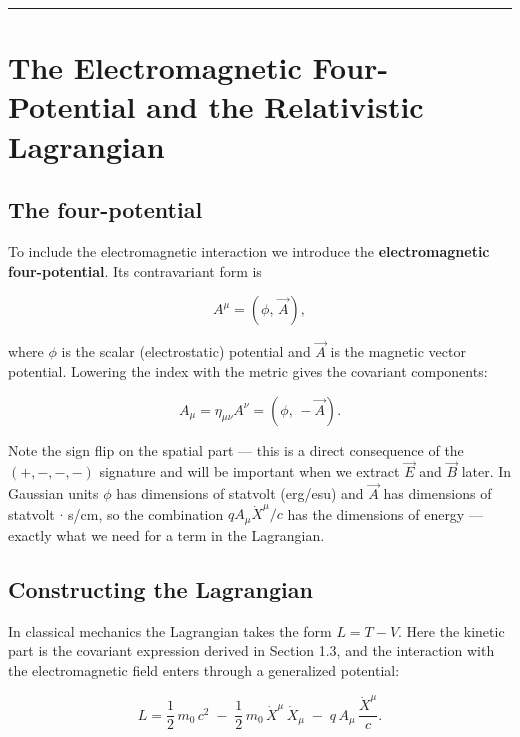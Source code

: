 \hrule
\vspace{1em}

\section{The Electromagnetic Four-Potential and the Relativistic Lagrangian}

\subsection*{The four-potential}

To include the electromagnetic interaction we introduce the \textbf{electromagnetic four-potential}. Its contravariant form is

\begin{equation}
A^\mu = (\phi,\, \vec{A}),
\end{equation}

where $\phi$ is the scalar (electrostatic) potential and $\vec{A}$ is the magnetic vector potential. Lowering the index with the metric gives the covariant components:

\begin{equation}
A_\mu = \eta_{\mu\nu}A^\nu = (\phi,\, -\vec{A}).
\end{equation}

Note the sign flip on the spatial part --- this is a direct consequence of the $(+,-,-,-)$ signature and will be important when we extract $\vec{E}$ and $\vec{B}$ later. In Gaussian units $\phi$ has dimensions of statvolt (erg/esu) and $\vec{A}$ has dimensions of statvolt $\cdot$ s/cm, so the combination $qA_\mu\dot{X}^\mu/c$ has the dimensions of energy --- exactly what we need for a term in the Lagrangian.

\subsection*{Constructing the Lagrangian}

In classical mechanics the Lagrangian takes the form $L = T - V$. Here the kinetic part is the covariant expression derived in Section 1.3, and the interaction with the electromagnetic field enters through a generalized potential:

\begin{equation}
\boxed{L = \frac{1}{2}\,m_0\,c^2 \;-\; \frac{1}{2}\,m_0\,\dot{X}^\mu\,\dot{X}_\mu \;-\; q\,A_\mu\,\frac{\dot{X}^\mu}{c}.}
\end{equation}

